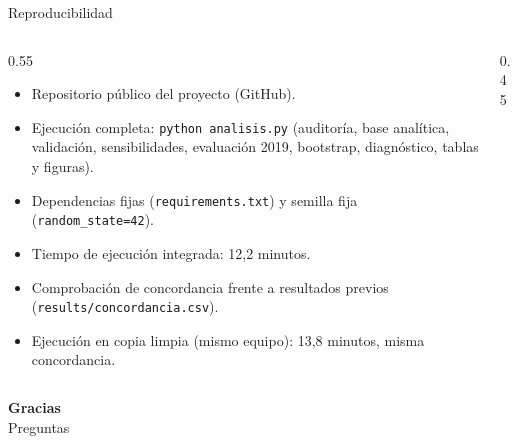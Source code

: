 \documentclass[11pt,aspectratio=169]{beamer}
\begin{document}
\begin{frame}{Reproducibilidad}
  \begin{columns}[T]
    \begin{column}{0.55\textwidth}
      \small
      \begin{itemize}
        \item Repositorio público del proyecto (GitHub).
        \item Ejecución completa: \texttt{python analisis.py} (auditoría, base analítica, validación, sensibilidades, evaluación 2019, bootstrap, diagnóstico, tablas y figuras).
        \item Dependencias fijas (\texttt{requirements.txt}) y semilla fija (\texttt{random\_state=42}).
        \item Tiempo de ejecución integrada: 12{,}2 minutos.
        \item Comprobación de concordancia frente a resultados previos (\texttt{results/concordancia.csv}).
        \item Ejecución en copia limpia (mismo equipo): 13{,}8 minutos, misma concordancia.
      \end{itemize}
    \end{column}
    \begin{column}{0.45\textwidth}
      \centering
    \end{column}
  \end{columns}
\end{frame}

\begin{frame}[plain]
  \begin{center}
    \vspace{2.5cm}
    {\textbf{Gracias}}\\[0.6cm]
    {\color{grafito} Preguntas}
  \end{center}
\end{frame}
\end{document}
